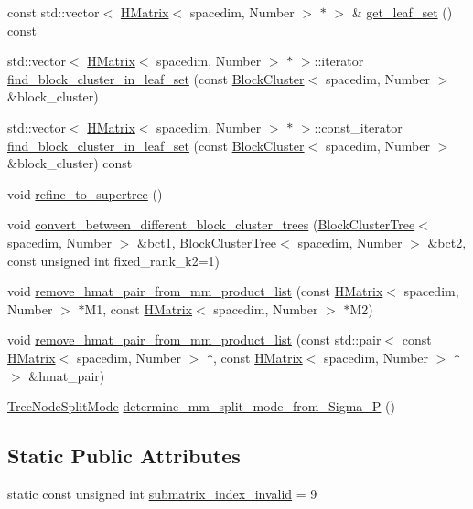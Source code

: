\begin{DoxyCompactItemize}
\item 
const std\+::vector$<$ \hyperlink{classHMatrix}{H\+Matrix}$<$ spacedim, Number $>$ $\ast$ $>$ \& \hyperlink{classHMatrix_a851d7bb3632bc1d18538d4d1dd5f6393}{get\+\_\+leaf\+\_\+set} () const
\item 
std\+::vector$<$ \hyperlink{classHMatrix}{H\+Matrix}$<$ spacedim, Number $>$ $\ast$ $>$\+::iterator \hyperlink{classHMatrix_ab0f83de878e6079330ec3c374f587a04}{find\+\_\+block\+\_\+cluster\+\_\+in\+\_\+leaf\+\_\+set} (const \hyperlink{classBlockCluster}{Block\+Cluster}$<$ spacedim, Number $>$ \&block\+\_\+cluster)
\item 
std\+::vector$<$ \hyperlink{classHMatrix}{H\+Matrix}$<$ spacedim, Number $>$ $\ast$ $>$\+::const\+\_\+iterator \hyperlink{classHMatrix_a723cc200afe31148fcc28f0120c5ec54}{find\+\_\+block\+\_\+cluster\+\_\+in\+\_\+leaf\+\_\+set} (const \hyperlink{classBlockCluster}{Block\+Cluster}$<$ spacedim, Number $>$ \&block\+\_\+cluster) const
\item 
void \hyperlink{classHMatrix_ad2b353962226c78910d6ddb6b5b8e460}{refine\+\_\+to\+\_\+supertree} ()
\item 
void \hyperlink{classHMatrix_af6fd60090b0de7bdea52fc84ddeb22c3}{convert\+\_\+between\+\_\+different\+\_\+block\+\_\+cluster\+\_\+trees} (\hyperlink{classBlockClusterTree}{Block\+Cluster\+Tree}$<$ spacedim, Number $>$ \&bct1, \hyperlink{classBlockClusterTree}{Block\+Cluster\+Tree}$<$ spacedim, Number $>$ \&bct2, const unsigned int fixed\+\_\+rank\+\_\+k2=1)
\item 
void \hyperlink{classHMatrix_a9e023f39b1f8916117a63557895a91b4}{remove\+\_\+hmat\+\_\+pair\+\_\+from\+\_\+mm\+\_\+product\+\_\+list} (const \hyperlink{classHMatrix}{H\+Matrix}$<$ spacedim, Number $>$ $\ast$M1, const \hyperlink{classHMatrix}{H\+Matrix}$<$ spacedim, Number $>$ $\ast$M2)
\item 
void \hyperlink{classHMatrix_ae0ab9b3be4ea0ef959da40e81313b2e3}{remove\+\_\+hmat\+\_\+pair\+\_\+from\+\_\+mm\+\_\+product\+\_\+list} (const std\+::pair$<$ const \hyperlink{classHMatrix}{H\+Matrix}$<$ spacedim, Number $>$ $\ast$, const \hyperlink{classHMatrix}{H\+Matrix}$<$ spacedim, Number $>$ $\ast$$>$ \&hmat\+\_\+pair)
\item 
\hyperlink{tree_8h_a922ca07db9633957939f697a65aff11d}{Tree\+Node\+Split\+Mode} \hyperlink{classHMatrix_a6f24998c7de1d0e336577be41c6281e3}{determine\+\_\+mm\+\_\+split\+\_\+mode\+\_\+from\+\_\+\+Sigma\+\_\+P} ()
\end{DoxyCompactItemize}
\subsection*{Static Public Attributes}
\begin{DoxyCompactItemize}
\item 
static const unsigned int \hyperlink{classHMatrix_a8b5a9fb65c716187d95bcdb43542884c}{submatrix\+\_\+index\+\_\+invalid} = 9
\end{DoxyCompactItemize}

